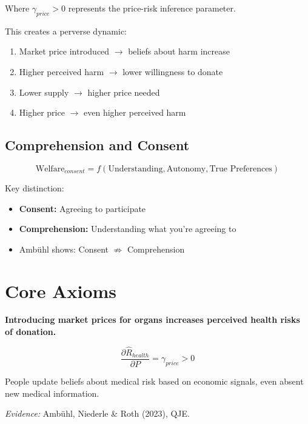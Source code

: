 Where $\gamma_{price} > 0$ represents the price-risk inference parameter.

This creates a perverse dynamic:
\begin{enumerate}
    \item Market price introduced $\rightarrow$ beliefs about harm increase
    \item Higher perceived harm $\rightarrow$ lower willingness to donate
    \item Lower supply $\rightarrow$ higher price needed
    \item Higher price $\rightarrow$ even higher perceived harm
\end{enumerate}

\subsection{Comprehension and Consent}

\begin{equation}
\text{Welfare}_{consent} = f(\text{Understanding}, \text{Autonomy}, \text{True Preferences})
\end{equation}

Key distinction:
\begin{itemize}
    \item \textbf{Consent:} Agreeing to participate
    \item \textbf{Comprehension:} Understanding what you're agreeing to
    \item Ambühl shows: Consent $\not\Rightarrow$ Comprehension
\end{itemize}

\section{Core Axioms}

\begin{tcolorbox}[colback=red!5!white,colframe=red!75!black,title=Axiom SA-1: Price-Risk Inference]
\textbf{Introducing market prices for organs increases perceived health risks of donation.}

\begin{equation}
\frac{\partial \hat{R}_{health}}{\partial P} = \gamma_{price} > 0
\end{equation}

People update beliefs about medical risk based on economic signals, even absent new medical information.

\textit{Evidence:} Ambühl, Niederle \& Roth (2023), QJE.
\end{tcolorbox}

